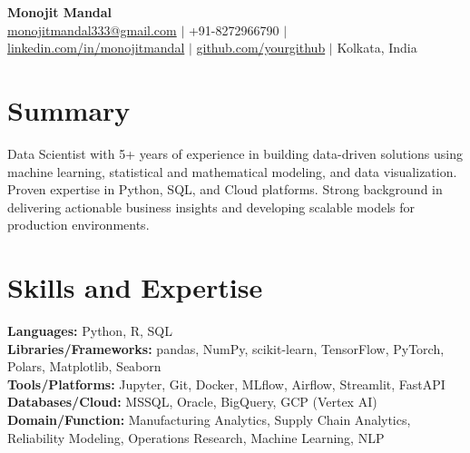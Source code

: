 \documentclass[a4paper,10pt]{article}
\begin{document}
\begin{center}
    {\LARGE \textbf{Monojit Mandal}}\\
    \href{mailto:monojitmandal333@gmail.com}{monojitmandal333@gmail.com} $|$ +91-8272966790 $|$ 
    \href{https://www.linkedin.com/in/monojitmandal/}{linkedin.com/in/monojitmandal} $|$ 
    \href{https://github.com/yourgithub}{github.com/yourgithub} $|$ Kolkata, India
\end{center}

\section*{Summary}
Data Scientist with 5+ years of experience in building data-driven solutions using machine learning, statistical and mathematical modeling, and data visualization. Proven expertise in Python, SQL, and Cloud platforms. Strong background in delivering actionable business insights and developing scalable models for production environments.

\section*{Skills and Expertise}
\textbf{Languages:} Python, R, SQL \\
\textbf{Libraries/Frameworks:} pandas, NumPy, scikit-learn, TensorFlow, PyTorch, Polars, Matplotlib, Seaborn \\
\textbf{Tools/Platforms:} Jupyter, Git, Docker, MLflow, Airflow, Streamlit, FastAPI \\
\textbf{Databases/Cloud:} MSSQL, Oracle, BigQuery, GCP (Vertex AI)\\
\textbf{Domain/Function:} Manufacturing Analytics, Supply Chain Analytics, Reliability Modeling, Operations Research, Machine Learning, NLP

\end{document}
